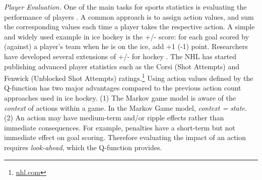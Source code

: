 \documentclass[runningheads,a4paper]{llncs}
\newcommand{\mstate}{s}
\newcommand{\action}{a}
\begin{document}

{\em Player Evaluation.} One of the main tasks for sports statistics is evaluating the performance of players \cite{Schumaker2010}.
A common approach is to assign action values, and sum the corresponding values each time a player takes the respective action.
A simple and widely used example in ice hockey is the +/- score: for each goal scored by (against) a player's team when he is on the ice, add +1 (-1) point. 
Researchers have developed several extensions of +/- for hockey \cite{Macdonald2011a,Spagnola2013,Schuckers2013}. The NHL has started publishing advanced player statistics such as the Corsi (Shot Attempts) and Fenwick (Unblocked Shot Attempts) ratings.\footnote{\url{nhl.com}}
Using action values defined by the Q-function has two major advantages compared to 
the previous action count approaches used in ice hockey. (1) The Markov game model is aware of the {\em context} of actions within a game. In the Markov Game model, \emph{context  = state.} 
(2) An action may have medium-term and/or ripple effects rather than immediate consequences. For example, penalties have a short-term but not immediate effect on goal scoring.
Therefore evaluating the impact of an action requires {\em look-ahead}, which the Q-function provides.  
\end{document}
